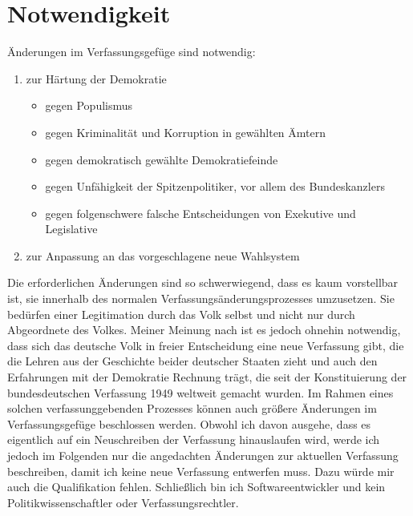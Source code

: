\section{Notwendigkeit}

Änderungen im Verfassungsgefüge sind notwendig:
\begin{enumerate}[label=\alph*)]
    \item zur Härtung der Demokratie
    \begin{itemize}
        \item gegen Populismus
        \item gegen Kriminalität und Korruption in gewählten Ämtern
        \item gegen demokratisch gewählte Demokratiefeinde
        \item gegen Unfähigkeit der Spitzenpolitiker, vor allem des Bundeskanzlers
        \item gegen folgenschwere falsche Entscheidungen von Exekutive und Legislative
    \end{itemize}
    \item zur Anpassung an das vorgeschlagene neue Wahlsystem
\end{enumerate}

Die erforderlichen Änderungen sind so schwerwiegend, dass es kaum vorstellbar ist, sie innerhalb des normalen Verfassungsänderungsprozesses umzusetzen.
Sie bedürfen einer Legitimation durch das Volk selbst und nicht nur durch Abgeordnete des Volkes.
Meiner Meinung nach ist es jedoch ohnehin notwendig, dass sich das deutsche Volk in freier Entscheidung eine neue Verfassung gibt,
die die Lehren aus der Geschichte beider deutscher Staaten zieht und auch den Erfahrungen mit der Demokratie Rechnung trägt, die seit der Konstituierung der bundesdeutschen Verfassung 1949 weltweit gemacht wurden.
Im Rahmen eines solchen verfassunggebenden Prozesses können auch größere Änderungen im Verfassungsgefüge beschlossen werden.
Obwohl ich davon ausgehe, dass es eigentlich auf ein Neuschreiben der Verfassung hinauslaufen wird, werde ich jedoch im Folgenden nur die angedachten Änderungen zur aktuellen Verfassung beschreiben, damit ich keine neue Verfassung entwerfen muss.
Dazu würde mir auch die Qualifikation fehlen.
Schließlich bin ich Softwareentwickler und kein Politikwissenschaftler oder Verfassungsrechtler.








